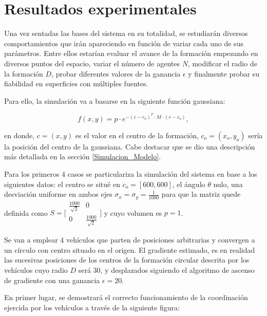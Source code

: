 
\chapter{Resultados experimentales}
\label{ch:chapter3}

Una vez sentadas las bases del sistema en su totalidad, se estudiarán diversos comportamientos que irán apareciendo en función de variar cada uno de sus parámetros. Entre ellos estarían evaluar el avance de la formación empezando en diversos puntos del espacio, variar el número de agentes $N$, modificar el radio de la formación $D$, probar diferentes valores de la ganancia $\epsilon$ y finalmente probar su fiabilidad en superficies con múltiples fuentes.

Para ello, la simulación va a basarse en la  siguiente función gaussiana:

\begin{equation}\label{Funcion_Gaussiana_2} 
	f\left(x,y\right) = p\cdot{e}^{-\left(c-c_o\right)^{T}\cdot{M}\cdot\left(c-c_{o}\right)},
\end{equation}

en donde, $c=\left(x,y\right)$ es el valor en el centro de la formación, $c_o=\left(x_{o},y_{o}\right)$ sería la posición del centro de la gaussiana. Cabe destacar que se dio una descripción más detallada en la sección \ref{Simulacion_Modelo}.

Para los primeros 4 casos se particulariza la simulación del sistema en base a los siguientes datos: el centro se situé en $c_{o}=[600,600]$, el ángulo $\theta$ nulo, una desviación uniforme en ambos ejes $\sigma_{x}=\sigma_{y}=\frac{1}{1000}$ para que la matriz quede definida como $S = \bigl[\begin{smallmatrix}\frac{1000}{\sqrt{2}} & 0\\ 0 & \frac{1000}{\sqrt{2}}\end{smallmatrix}\bigr]$  y cuyo volumen es $p = 1$.

Se van a emplear 4 vehículos que parten de posiciones arbitrarias y convergen a un círculo con centro situado en el origen. El gradiente estimado, es en realidad las sucesivas posiciones de los centros de la formación circular descrita por los vehículos cuyo radio $D$ será 30, y desplazados siguiendo el algoritmo de ascenso de gradiente con una ganancia $\epsilon=20$. 

En primer lugar, se demostrará el correcto funcionamiento de la coordinación ejercida por los vehículos a través de la siguiente figura:


